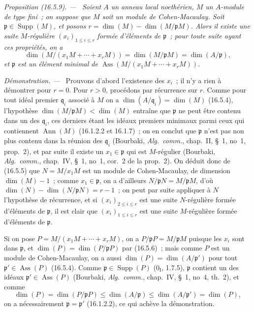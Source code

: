 \documentclass[10pt,oneside]{book}
\makeatletter
\newcommand{\setmanualcurrentlabel}[1]{\def\@currentlabel{#1}}
\newenvironment{proposition}[1][]{%
  \setmanualcurrentlabel{#1}\par\medskip\noindent\itshape Proposition (#1). ---\ }{\par}
\newenvironment{proof}{%
  \par\medskip\noindent\textit{Démonstration. ---\ }}{\par}
\makeatother
\begin{document}
\begin{proposition}[16.5.9]
\label{0.16.5.9-fr}
Soient $A$ un anneau local noethérien, $M$ un $A$-module de type fini~; on
suppose que $M$ soit un module de Cohen-Macaulay. Soit
$\mathfrak{p}\in\operatorname{Supp}(M)$, et posons
$r=\dim(M)-\dim(M/\mathfrak{p}M)$. Alors il existe une suite $M$-régulière
$(x_i)_{1\leq i\leq r}$ formée d'éléments de $\mathfrak{p}$~; pour toute
suite ayant ces propriétés, on a
\[
  \dim(M/(x_1M+\cdots+x_rM))
  =\dim(M/\mathfrak{p}M)=\dim(A/\mathfrak{p}),
\]
et $\mathfrak{p}$ est un élément minimal de
$\operatorname{Ass}(M/(x_1M+\cdots+x_rM))$.
\end{proposition}

\begin{proof}
Prouvons d'abord l'existence des $x_i$~; il n'y a rien à démontrer pour
$r=0$. Pour $r>0$, procédons par récurrence sur $r$. Comme pour tout idéal
premier $\mathfrak{q}_i$ associé à $M$ on a
$\dim(A/\mathfrak{q}_i)=\dim(M)$ (16.5.4), l'hypothèse
$\dim(M/\mathfrak{p}M)<\dim(M)$ entraîne que $\mathfrak{p}$ ne peut être
contenu dans un des $\mathfrak{q}_i$, ces derniers étant les idéaux premiers
minimaux parmi ceux qui contiennent $\operatorname{Ann}(M)$ (16.1.2.2 et
16.1.7)~; on en conclut que $\mathfrak{p}$ n'est pas non plus contenu dans la
réunion des $\mathfrak{q}_i$ (Bourbaki, \emph{Alg.~comm.}, chap.~II, \S~1,
no~1, prop.~2), et par suite il existe un $x_1\in\mathfrak{p}$ qui est
$M$-régulier (Bourbaki, \emph{Alg.~comm.}, chap.~IV, \S~1, no~1, cor.~2 de
la prop.~2). On déduit donc de (16.5.5) que $N=M/x_1M$ est un module de
Cohen-Macaulay, de dimension $\dim(M)-1$~; comme $x_1\in\mathfrak{p}$, on a
d'ailleurs $N/\mathfrak{p}N=M/\mathfrak{p}M$, d'où
$\dim(N)-\dim(N/\mathfrak{p}N)=r-1$~; on peut par suite appliquer à $N$
l'hypothèse de récurrence, et si $(x_i)_{2\leq i\leq r}$ est une suite
$N$-régulière formée d'éléments de $\mathfrak{p}$, il est clair que
$(x_i)_{1\leq i\leq r}$ est une suite $M$-régulière formée d'éléments de
$\mathfrak{p}$.

Si on pose $P=M/(x_1M+\cdots+x_rM)$, on a
$P/\mathfrak{p}P=M/\mathfrak{p}M$ puisque les $x_i$ sont dans
$\mathfrak{p}$, et $\dim(P)=\dim(P/\mathfrak{p}P)$ par (16.5.6)~; mais comme
$P$ est un module de Cohen-Macaulay, on a aussi
$\dim(P)=\dim(A/\mathfrak{p}')$ pour tout
$\mathfrak{p}'\in\operatorname{Ass}(P)$ (16.5.4). Comme
$\mathfrak{p}\in\operatorname{Supp}(P)$ ($0_{\mathrm I}$, 1.7.5),
$\mathfrak{p}$ contient un des idéaux
$\mathfrak{p}'\in\operatorname{Ass}(P)$ (Bourbaki, \emph{Alg.~comm.},
chap.~IV, \S~1, no~4, th.~2), et comme
\[
  \dim(P)=\dim(P/\mathfrak{p}P)
  \leq\dim(A/\mathfrak{p})
  \leq\dim(A/\mathfrak{p}')=\dim(P),
\]
on a nécessairement $\mathfrak{p}=\mathfrak{p}'$ (16.1.2.2), ce qui achève
la démonstration.
\end{proof}
\end{document}
